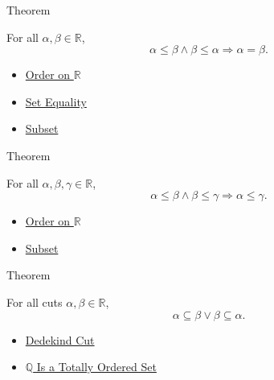 \begin{theorembox}{Theorem}
\begin{theorem}
\label{thm:order-on-r-antisymmetric}
For all $\alpha,\beta\in\mathbb{R}$,
\[
\alpha\le\beta\land\beta\le\alpha \Longrightarrow \alpha=\beta.
\]
\end{theorem}
\end{theorembox}

\begin{dependencies}
\begin{itemize}
  \item \hyperref[def:order-on-r]{Order on $\mathbb{R}$}
  \item \hyperref[def:set-equality]{Set Equality}
  \item \hyperref[def:subset]{Subset}
\end{itemize}
\end{dependencies}

\begin{theorembox}{Theorem}
\begin{theorem}
\label{thm:order-on-r-transitive}
For all $\alpha,\beta,\gamma\in\mathbb{R}$,
\[
\alpha\le\beta\land\beta\le\gamma \Longrightarrow \alpha\le\gamma.
\]
\end{theorem}
\end{theorembox}

\begin{dependencies}
\begin{itemize}
  \item \hyperref[def:order-on-r]{Order on $\mathbb{R}$}
  \item \hyperref[def:subset]{Subset}
\end{itemize}
\end{dependencies}

\begin{theorembox}{Theorem}
\begin{theorem}
\label{thm:comparability-of-cuts}
For all cuts $\alpha,\beta\in\mathbb{R}$,
\[
\alpha\subseteq\beta \lor \beta\subseteq\alpha.
\]
\end{theorem}
\end{theorembox}

\begin{dependencies}
\begin{itemize}
  \item \hyperref[def:dedekind-cut]{Dedekind Cut}
  \item \hyperref[thm:q-totally-ordered-set]{$\mathbb{Q}$ Is a Totally Ordered Set}
\end{itemize}
\end{dependencies}

